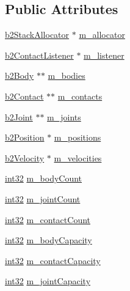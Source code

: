 \subsection*{Public Attributes}
\begin{DoxyCompactItemize}
\item 
\mbox{\hyperlink{classb2_stack_allocator}{b2\+Stack\+Allocator}} $\ast$ \mbox{\hyperlink{classb2_island_a5e28f216c0a12548c04491ab1d73c958}{m\+\_\+allocator}}
\item 
\mbox{\hyperlink{classb2_contact_listener}{b2\+Contact\+Listener}} $\ast$ \mbox{\hyperlink{classb2_island_aeba73fe42839d0361524d98e330e8e66}{m\+\_\+listener}}
\item 
\mbox{\hyperlink{classb2_body}{b2\+Body}} $\ast$$\ast$ \mbox{\hyperlink{classb2_island_ac9c65abf14c88e8a52fdd2c5cb56c5f4}{m\+\_\+bodies}}
\item 
\mbox{\hyperlink{classb2_contact}{b2\+Contact}} $\ast$$\ast$ \mbox{\hyperlink{classb2_island_a49499a350859768a0c3f7b29fb091422}{m\+\_\+contacts}}
\item 
\mbox{\hyperlink{classb2_joint}{b2\+Joint}} $\ast$$\ast$ \mbox{\hyperlink{classb2_island_a6653da11b66de22d8ba5db531c11b373}{m\+\_\+joints}}
\item 
\mbox{\hyperlink{structb2_position}{b2\+Position}} $\ast$ \mbox{\hyperlink{classb2_island_a0f05bd177cf942ddfb494b17ec09b874}{m\+\_\+positions}}
\item 
\mbox{\hyperlink{structb2_velocity}{b2\+Velocity}} $\ast$ \mbox{\hyperlink{classb2_island_ae6a42be7ce4c03724a6da17d96cacb9f}{m\+\_\+velocities}}
\item 
\mbox{\hyperlink{b2_settings_8h_a43d43196463bde49cb067f5c20ab8481}{int32}} \mbox{\hyperlink{classb2_island_af78d066321e18cd8a4e409c4539ccb81}{m\+\_\+body\+Count}}
\item 
\mbox{\hyperlink{b2_settings_8h_a43d43196463bde49cb067f5c20ab8481}{int32}} \mbox{\hyperlink{classb2_island_a913c91afb35ff717c7dd5b0aa1559e5b}{m\+\_\+joint\+Count}}
\item 
\mbox{\hyperlink{b2_settings_8h_a43d43196463bde49cb067f5c20ab8481}{int32}} \mbox{\hyperlink{classb2_island_ab5bad98e18356b15a68733be07b98abf}{m\+\_\+contact\+Count}}
\item 
\mbox{\hyperlink{b2_settings_8h_a43d43196463bde49cb067f5c20ab8481}{int32}} \mbox{\hyperlink{classb2_island_a5ea371889bb93fb6387ff2ab427191ed}{m\+\_\+body\+Capacity}}
\item 
\mbox{\hyperlink{b2_settings_8h_a43d43196463bde49cb067f5c20ab8481}{int32}} \mbox{\hyperlink{classb2_island_a1a65b8fc8256ca443f85e6ae6f2d841a}{m\+\_\+contact\+Capacity}}
\item 
\mbox{\hyperlink{b2_settings_8h_a43d43196463bde49cb067f5c20ab8481}{int32}} \mbox{\hyperlink{classb2_island_a9b6e63c89307d469e1075585d65a9bbb}{m\+\_\+joint\+Capacity}}
\end{DoxyCompactItemize}


